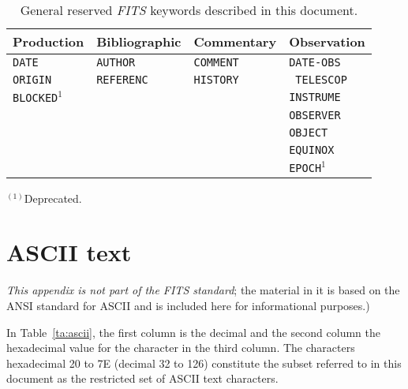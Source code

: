 \documentclass[onecolumn]{aa}
\begin{document}
\begin{table}[hbp]
\begin{center}
\caption[General reserved {\em FITS\/} keywords.]
        {General reserved {\em FITS\/} keywords described in this document.}
\label{ta:generalkeys}
\begin{tabular}{llll} 
\hline \hline
\multicolumn{1}{c}{Production} & \multicolumn{1}{c}{Bibliographic} & 
\multicolumn{1}{c}{Commentary} & \multicolumn{1}{c}{Observation}  
\\ \hline
{\tt DATE}    & {\tt AUTHOR}      & {\tt COMMENT}   & {\tt DATE-OBS}
\\
{\tt ORIGIN}   & {\tt REFERENC}     & {\tt HISTORY}   & {\tt
TELESCOP}     \\
{\tt BLOCKED}$^{1}$&               &\verb*+        + & {\tt INSTRUME} \\
               &                    &                 & {\tt OBSERVER}     \\
               &                    &                 & {\tt OBJECT}       \\
               &                    &                 & {\tt EQUINOX}      \\
               &                    &                 & {\tt EPOCH}$^{1}$  \\
\hline
\end{tabular}
\end{center}
$^{(1)}$Deprecated.

\end{table}

\ifiaufwgstyle
\clearpage
\fi

\section{ASCII text}
   \label{s:Atxt}

{\em This appendix is not part of the {\em FITS\/} standard}; the 
material in it is based on the ANSI standard for ASCII \citep{ansi77} and is 
included here for informational purposes.)

In Table~\ref{ta:ascii}, the first column is 
the decimal
and the second column the hexadecimal value for the character 
in the third column.  The characters hexadecimal 20 to 7E (decimal 32 
to 126) constitute the subset referred to in this document as the restricted
set of ASCII text characters.                                                        
      
\end{document}
